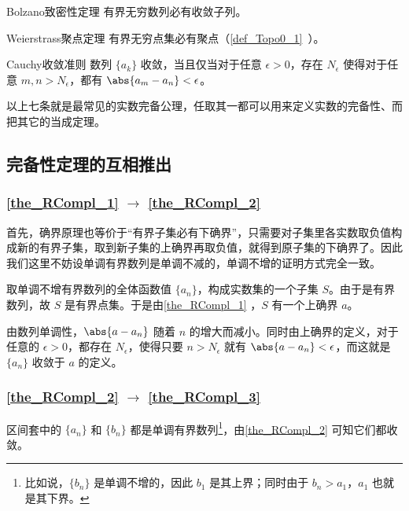\begin{theorem}{Bolzano致密性定理}\label{the_RCompl_5}
有界无穷数列必有收敛子列。
\end{theorem}

\begin{theorem}{Weierstrass聚点定理}\label{the_RCompl_6}
有界无穷点集必有聚点（\autoref{def_Topo0_1}~）。
\end{theorem}

\begin{theorem}{Cauchy收敛准则}\label{the_RCompl_7}
数列 $\{a_k\}$ 收敛，当且仅当对于任意 $\epsilon>0$，存在 $N_\epsilon$ 使得对于任意 $m, n>N_\epsilon$，都有 $\abs{a_m-a_n}<\epsilon$。
\end{theorem}

以上七条就是最常见的实数完备公理，任取其一都可以用来定义实数的完备性、而把其它的当成定理。

\subsection{完备性定理的互相推出}

\subsubsection{\autoref{the_RCompl_1} $\to$ \autoref{the_RCompl_2} }

首先，确界原理也等价于“有界子集必有下确界”，只需要对子集里各实数取负值构成新的有界子集，取到新子集的上确界再取负值，就得到原子集的下确界了。因此我们这里不妨设单调有界数列是单调不减的，单调不增的证明方式完全一致。

取单调不增有界数列的全体函数值 $\{a_n\}$，构成实数集的一个子集 $S$。由于是有界数列，故 $S$ 是有界点集。于是由\autoref{the_RCompl_1} ，$S$ 有一个上确界 $a$。

由数列单调性，$\abs{a-a_n}$ 随着 $n$ 的增大而减小。同时由上确界的定义，对于任意的 $\epsilon>0$，都存在 $N_\epsilon$，使得只要 $n>N_\epsilon$ 就有 $\abs{a-a_n}<\epsilon$，而这就是 $\{a_n\}$ 收敛于 $a$ 的定义。

\subsubsection{\autoref{the_RCompl_2} $\to$ \autoref{the_RCompl_3} }

区间套中的 $\{a_n\}$ 和 $\{b_n\}$ 都是单调有界数列\footnote{比如说，$\{b_n\}$ 是单调不增的，因此 $b_1$ 是其上界；同时由于 $b_n>a_1$，$a_1$ 也就是其下界。}，由\autoref{the_RCompl_2} 可知它们都收敛。

